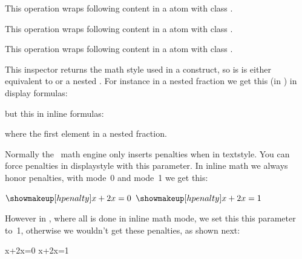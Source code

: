 \stopnewprimitive

\startoldprimitive[title={\prm {mathop}}]

This operation wraps following content in a atom with class .

\stopoldprimitive

\startoldprimitive[title={\prm {mathopen}}]

This operation wraps following content in a atom with class .

\stopoldprimitive

\startoldprimitive[title={\prm {mathord}}]

This operation wraps following content in a atom with class .

\stopoldprimitive

\startnewprimitive[title={\prm {mathparentstyle}}]

This inspector returns the math style used in a construct, so is is either
equivalent to  or a nested . For instance
in a nested fraction we get this (in \CONTEXT) in display formulas:

\def\foo{(\the\mathmainstyle,\the\mathparentstyle,\the\mathstyle)}

\dm{
    \frac{\frac{\foo}{\foo}}{\frac{\foo}{\foo}} + \foo
}

but this in inline formulas:

\im{
    \frac{\frac{\foo}{\foo}}{\frac{\foo}{\foo}} + \foo
}

where the first element in a nested fraction.

\stopnewprimitive

\startnewprimitive[title={\prm {mathpenaltiesmode}}]

Normally the \TEX\ math engine only inserts penalties when in textstyle. You can
force penalties in displaystyle with this parameter. In inline math we always
honor penalties, with mode~0 and mode~1 we get this:

\pushoverloadmode

\startlines
{ \let\mathpenaltiesmode\scratchcounter $\showmakeup[hpenalty]x+2x=0$}
{ \let\mathpenaltiesmode\scratchcounter $\showmakeup[hpenalty]x+2x=1$}
\stoplines

However in \CONTEXT, where all is done in inline math mode, we set this this
parameter to~1, otherwise we wouldn't get these penalties, as shown next:

{ \let\mathpenaltiesmode\scratchcounter \startformula \showmakeup[hpenalty]x+2x=0 \stopformula}
{ \let\mathpenaltiesmode\scratchcounter \startformula \showmakeup[hpenalty]x+2x=1 \stopformula}

